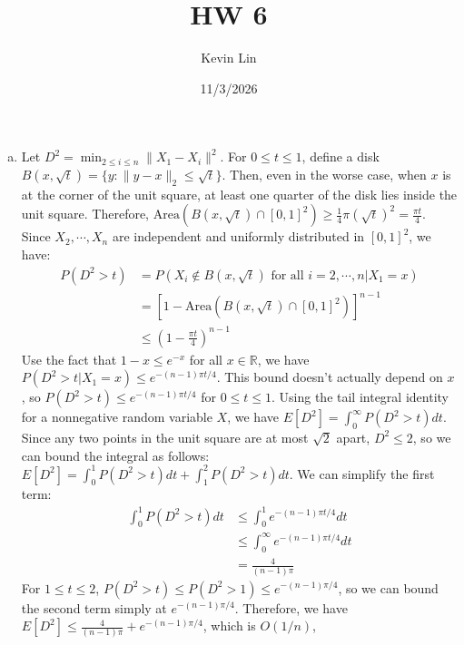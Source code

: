 \documentclass[11pt,a4paper,margin=1in]{article}
\title{HW 6}
\author{Kevin Lin}
\date{11/3/2026}
\begin{document}
\maketitle

\section{}
\begin{enumerate}[(a)]
    \item Let $D^2 = \min_{2 \leq i \leq n}\|X_1 - X_i\|^2$. For $0 \leq t \leq 1$,
    define a disk $B(x, \sqrt{t}) = \{y : \|y - x\|_2 \leq \sqrt{t}\}$. Then, even
    in the worse case, when $x$ is at the corner of the unit square, at least
    one quarter of the disk lies inside the unit square. Therefore, $\text{Area}(B(x, \sqrt{t}) \cap [0, 1]^2) \geq \frac{1}{4}\pi(\sqrt{t})^2  = \frac{\pi t}{4}$. 
    Since $X_2, \cdots, X_n$ are independent and uniformly distributed in $[0, 1]^2$, 
    we have:
    \begin{align*}
        P(D^2 > t) &= P(X_i \notin B(x, \sqrt{t}) \text{ for all } i = 2, \cdots, n | X_1 = x) \\
        &= [1 - \text{Area}(B(x, \sqrt{t}) \cap [0, 1]^2)]^{n - 1} \\
        &\leq \left(1 - \frac{\pi t}{4}\right)^{n - 1}
    \end{align*}
    Use the fact that $1 - x \leq e^{-x}$ for all $x \in \mathbb{R}$, we have
    $P(D^2 > t | X_1 = x) \leq e^{-(n - 1)\pi t/4}$. This bound doesn't actually
    depend on $x$, so $P(D^2 > t) \leq e^{-(n - 1)\pi t/4}$ for $0 \leq t \leq 1$.
    Using the tail integral identity for a nonnegative random variable $X$, we have
    $E[D^2] = \int_0^\infty P(D^2 > t) dt$. Since any two points in the unit square
    are at most $\sqrt{2}$ apart, $D^2 \leq 2$, so we can bound the integral as follows:
    $E[D^2] = \int_0^1 P(D^2 > t) dt + \int_1^2 P(D^2 > t) dt$. 
    We can simplify the first term:
    \begin{align*}
        \int_0^1 P(D^2 > t) dt &\leq \int_0^1 e^{-(n - 1)\pi t/4} dt \\
        &\leq \int_0^\infty e^{-(n - 1)\pi t/4} dt \\
        &= \frac{4}{(n - 1)\pi}
    \end{align*}
    For $1 \leq t \leq 2$, $P(D^2 > t) \leq P(D^2 > 1) \leq e^{-(n - 1)\pi/4}$, 
    so we can bound the second term simply at $e^{-(n - 1)\pi/4}$. Therefore, we have
    $E[D^2] \leq \frac{4}{(n - 1)\pi} + e^{-(n - 1)\pi/4}$, which is $O(1/n)$,

\end{enumerate}
\end{document}
